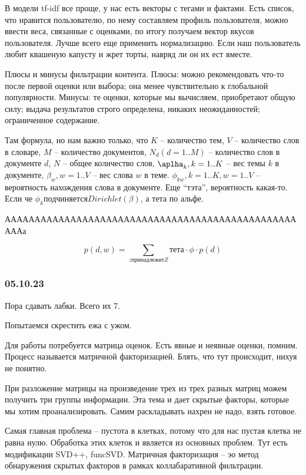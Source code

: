 В модели tf-idf все проще, у нас есть векторы с тегами и фактами. Есть список, что нравится пользователю, по нему составляем профиль пользователя, можно ввести веса, связанные с оценками, по итогу получаем вектор вкусов пользователя. Лучше всего еще применить нормализацию. Если наш пользователь любит квашеную капусту и жрет торты, навряд ли он их ест вместе.

Плюсы и минусы фильтрации контента. Плюсы: можно рекомендовать что-то после первой оценки или выбора; она менее чувствительно к глобальной популярности. Минусы: те оценки, которые мы вычисляем, приобретают общую силу; выдача результатов строго определена, никаких неожиданностей; ограниченное содержание.

Там формула, но нам важно только, что $K$ -- количество тем, $V$ -- количество слов в словаре, $M$ -- количество документов, $N_d (d = 1..M)$ -- количество слов в документе $d$, $N$ -- общее количество слов, $\aplha_k, k = 1..K$ -- вес темы $k$ в документе, $\beta_w, w = 1..V$ -- вес слова $w$ в теме. $\phi_{kw}, k = 1..K, w= 1..V$ -- вероятность нахождения слова в документе. Еще ``тэта'', вероятность какая-то. Если че $\phi_k \text{подчиняется} Dirichlet(\beta)$, а тета по альфе.

ААААААААААААААААААААААААААААААААААААААААААААААААААААа

\begin{equation}
    p(d, w) = \sum_{z \text{принадлежит} Z} \text{тета} \cdot \phi \cdot p(d)
\end{equation}

\subsubsection{05.10.23}

Пора сдавать лабки. Всего их 7.


 Попытаемся скрестить ежа с ужом.

 Для работы потребуется матрица оценок. Есть явные и неявные оценки, помним. Процесс называется матричной факторизацией. Блять, что тут происходит, нихуя не понятно.

 При разложение матрицы на произведение трех из трех разных матриц можем получить три группы информации. Эта тема и дает скрытые факторы, которые мы хотим проанализировать. Самим раскладывать нахрен не надо, взять готовое.

 Самая главная проблема -- пустота в клетках, потому что для нас пустая клетка не равна нулю. Обработка этих клеток и является из основных проблем. Тут есть модификации SVD++, funcSVD. Матричная факторизация -- эо метод обнаружения скрытых факторов в рамках коллабаративной фильтрации.

